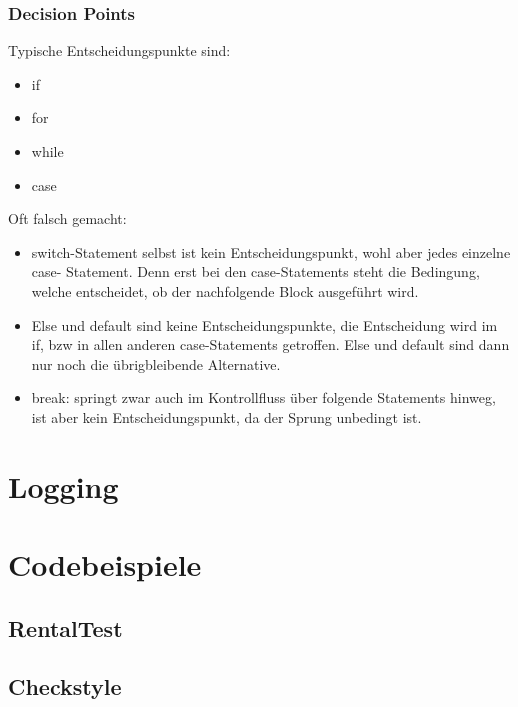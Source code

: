 \documentclass[10pt]{article}
\begin{document}
	
	\subsubsection{Decision Points}
	Typische Entscheidungspunkte sind:
	\begin{multicols}{2}
	\begin{itemize}
		\item if
		\item for
		\item while
		\item case
	\end{itemize}
	\end{multicols}
	Oft falsch gemacht:
	\begin{itemize}
		\item switch-Statement selbst ist kein Entscheidungspunkt, wohl aber jedes einzelne case- Statement. Denn erst bei den case-Statements steht die Bedingung, welche entscheidet, ob der nachfolgende Block ausgef\"uhrt wird.
		\item Else und default sind keine Entscheidungspunkte, die Entscheidung wird im if, bzw in allen anderen case-Statements getroffen. Else und default sind dann nur noch die \"ubrigbleibende Alternative.
		\item break: springt zwar auch im Kontrollfluss \"uber folgende Statements hinweg, ist aber kein Entscheidungspunkt, da der Sprung unbedingt ist.
	\end{itemize}
	
	\newpage
	
	
	\section{Logging}
	
    \section{Codebeispiele} \label{sec:codebeispiele}

    \subsection{RentalTest} \label{subsec:rentaltest}
    
	\newpage
	

    \subsection{Checkstyle} \label{subsec:heckstyle}
    

\end{document}
